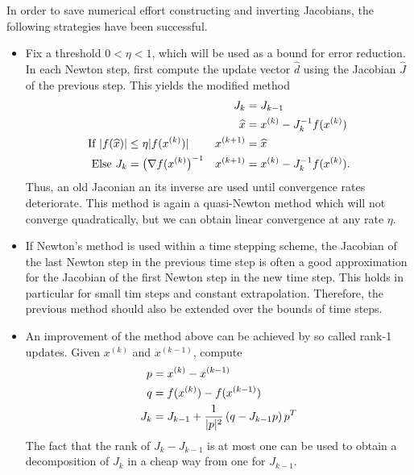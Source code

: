 \begin{remark}
  In order to save numerical effort constructing and inverting
  Jacobians, the following strategies have been successful.
  \begin{itemize}
  \item Fix a threshold $0<\eta<1$, which will be used as a bound for
    error reduction. In each Newton step, first compute the update
    vector $\widehat d$ using the Jacobian $\widehat J$ of the
    previous step. This yields the modified method
    \begin{gather}
      \label{eq:newton:1}
      \begin{alignedat}2
        &&J_k &= J_{k-1} \\
        &&\widehat x &= x^{(k)} - J_{k}^{-1}f(x^{(k)})\\
        \text{If }\abs{f(\widehat x)} &\le \eta
          \abs{f(x^{(k)})} \quad& x^{(k+1)} &= \widehat x\\
          \text{Else } J_k &= \bigl(\nabla f(x^{(k)}\bigr)^{-1}
          \quad & x^{(k+1)} &=x^{(k)}- J_{k}^{-1}f(x^{(k)}). 
      \end{alignedat}
    \end{gather}
    Thus, an old Jaconian an its inverse are used until convergence
    rates deteriorate. This method is again a quasi-Newton method
    which will not converge quadratically, but we can obtain linear
    convergence at any rate $\eta$.
  \item If Newton's method is used within a time stepping scheme, the
    Jacobian of the last Newton step in the previous time step is
    often a good approximation for the Jacobian of the first Newton
    step in the new time step. This holds in particular for small tim
    steps and constant extrapolation. Therefore, the previous method
    should also be extended over the bounds of time steps.
  \item An improvement of the method above can be achieved by so
    called rank-1 updates. Given $x^{(k)}$ and $x^{(k-1)}$, compute
    \begin{gather}
      \label{eq:newton:2}
      \begin{split}
        p &= x^{(k)} - x^{(k-1)}\\
        q &= f(x^{(k)}) - f(x^{(k-1)})\\
        J_k &= J_{k-1} + \frac1{\lvert p\rvert^2}
        \left(q - J_{k-1} p\right)p^T
      \end{split}
    \end{gather}
    The fact that the rank of $J_k - J_{k-1}$ is at most one can be
    used to obtain a decomposition of $J_k$ in a cheap way from one
    for $J_{k-1}$.
  \end{itemize}
\end{remark}

